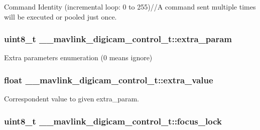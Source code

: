 Command Identity (incremental loop\+: 0 to 255)//\+A command sent multiple times will be executed or pooled just once. 

\hypertarget{struct____mavlink__digicam__control__t_a2fbbfda72699162be9a4d1eb915a1383}{
\subsubsection[{extra\+\_\+param}]{\setlength{\rightskip}{0pt plus 5cm}uint8\+\_\+t \+\_\+\+\_\+mavlink\+\_\+digicam\+\_\+control\+\_\+t\+::extra\+\_\+param}}\label{struct____mavlink__digicam__control__t_a2fbbfda72699162be9a4d1eb915a1383}


Extra parameters enumeration (0 means ignore) 

\hypertarget{struct____mavlink__digicam__control__t_ad1a5e51e06068d73310cd77623ab720c}{
\subsubsection[{extra\+\_\+value}]{\setlength{\rightskip}{0pt plus 5cm}float \+\_\+\+\_\+mavlink\+\_\+digicam\+\_\+control\+\_\+t\+::extra\+\_\+value}}\label{struct____mavlink__digicam__control__t_ad1a5e51e06068d73310cd77623ab720c}


Correspondent value to given extra\+\_\+param. 

\hypertarget{struct____mavlink__digicam__control__t_ace7736fd2e64e2729a128e3e7d7cd407}{
\subsubsection[{focus\+\_\+lock}]{\setlength{\rightskip}{0pt plus 5cm}uint8\+\_\+t \+\_\+\+\_\+mavlink\+\_\+digicam\+\_\+control\+\_\+t\+::focus\+\_\+lock}}\label{struct____mavlink__digicam__control__t_ace7736fd2e64e2729a128e3e7d7cd407}


